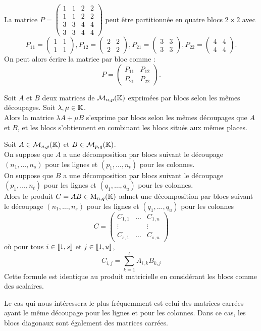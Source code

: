 \documentclass{book}
\begin{document}
\begin{Exemple}
La matrice ${P} ={\begin{pmatrix}1&1&2&2\\1&1&2&2\\3&3&4&4\\3&3&4&4\end{pmatrix}}$
peut être partitionnée en quatre blocs $2\times 2$ avec $$P_{11}={\begin{pmatrix}1&1\\1&1\end{pmatrix}},P_{12}={\begin{pmatrix}2&2\\2&2\end{pmatrix}},P_{21}={\begin{pmatrix}3&3\\3&3\end{pmatrix}},{P}_{22}={\begin{pmatrix}4&4\\4&4\end{pmatrix}}.$$
On peut alors écrire la matrice par bloc comme :
$$P={\begin{pmatrix} {P} _{11}& {P} _{12}\\ {P} _{21}& {P} _{22}\end{pmatrix}}.$$
\end{Exemple}
\begin{Proposition}
Soit $A$ et $B$ deux matrices de $\mathcal{M}_{n,p}(\mathbb{K})$ exprimées par blocs selon les mêmes découpages. Soit $\lambda ,\mu  \in  \mathbb{K} $.\\
Alors la matrice $\lambda A + \mu  B$ s'exprime par blocs selon les mêmes découpages que $A$ et $B$, et les blocs s'obtiennent en combinant les blocs situés aux mêmes places.
\end{Proposition}
\begin{Proposition}
Soit $A\in  \mathcal{M}_{n,p}(\mathbb{K})$ et $B\in  \mathcal{M}_{p,q}(\mathbb{K})$.\\
On suppose que $A$ a une décomposition par blocs suivant le découpage $(n_1,\dots,n_s)$ pour les lignes et $(p_1,\dots,n_t)$ pour les colonnes.\\
On suppose que $B$ a une décomposition par blocs suivant le découpage $(p_1,\dots,n_t)$ pour les lignes et $(q_1,\dots,q_u)$ pour les colonnes.\\
Alors le produit $C = AB\in  \mathrm{M}_{n,q}(\mathbb{K} )$ admet une décomposition par blocs suivant le découpage $(n_1,\dots,n_s)$ pour les lignes et $(q_1,\dots,q_u)$ pour les colonnes
$$ C = \begin{pmatrix} C_{1,1} &  \dots &  C_{1,u}  \\  \vdots &   &  \vdots  \\  C_{s,1} &  \dots &  C_{s,u} \end{pmatrix} $$
où pour tous $i\in  \mathopen\lbrack\!\lbrack1,s \mathclose\rbrack\!\rbrack$ et $j\in  \mathopen\lbrack\!\lbrack1,u \mathclose\rbrack\!\rbrack$,
$$ C_{i,j} = \sum  _{k=1}^t A_{i,k} B_{k,j} $$
Cette formule est identique au produit matricielle en considérant les blocs comme des scalaires.
\end{Proposition}
\begin{Remarque}
Le cas qui nous intéressera le plus fréquemment est celui des matrices carrées ayant le même découpage pour les lignes et pour les colonnes. Dans ce cas, les blocs diagonaux sont également des matrices carrées.
\end{Remarque}
\end{document}
